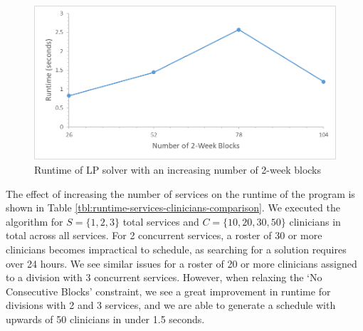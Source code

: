 \begin{figure}[h]
	\centering
	\includegraphics[scale=.5]{fig/runtime_blocks}
	\caption{Runtime of LP solver with an increasing number of 2-week blocks}
	\label{fig:runtime-blocks}
\end{figure}

The effect of increasing the number of services %
on the runtime of the program is shown in Table \ref{tbl:runtime-services-clinicians-comparison}. We executed the algorithm for $S = \{1, 2, 3\}$ total services and $C = \{10, 20, 30, 50\}$ clinicians in total across all services. For 2 concurrent services, a roster of 30 or more clinicians becomes impractical to schedule, as searching for a solution requires over 24 hours. We see similar issues for a roster of 20 or more clinicians assigned to a division with 3 concurrent services. However, when relaxing the `No Consecutive Blocks' constraint, we see a great improvement in runtime for divisions with 2 and 3 services, and we are able to generate a schedule with upwards of 50 clinicians in under 1.5 seconds. \\  %

